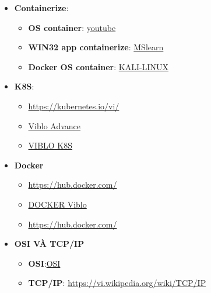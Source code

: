 \documentclass[a4paper,12pt]{article}
\begin{document}
\begin{itemize}
    \item \textbf{Containerize}:
    \begin{itemize}
        \item \textbf{OS container}: \href{ https://www.youtube.com/watch?v=kICnD0pRBZU&pp=ygUlY29udGFpbmVyaXplIGEgbGludXggb3BlcmF0aW5nIHN5c3RlbQ%3D%3D}
        {youtube}
        \item  \textbf{WIN32 app containerize}: \href{https://learn.microsoft.com/vi-vn/windows/win32/com/containers}{MSlearn}
        \item \textbf{Docker OS container}: \href{https://www.kali.org/docs/containers/kalilinux-lxc-images/}{KALI-LINUX}
    \end{itemize}
    \item \textbf{K8S}:
    \begin{itemize}
        \item \href{https://kubernetes.io/vi/}{https://kubernetes.io/vi/}
        \item  \href{https://viblo.asia/p/kubernetes-so-sanh-giua-deployments-statefulsets-va-daemonsets-khi-nao-nen-su-dung-chung-ORNZqXd3K0n}{Viblo Advance}
        \item \href{https://viblo.asia/p/tim-hieu-co-ban-ve-kubernetes-k8s-part-1-924lJ4bbKPM}{VIBLO K8S}
    \end{itemize}
    \item \textbf{Docker}
    \begin{itemize}
        \item \href{https://hub.docker.com/}{https://hub.docker.com/}
        \item \href{https://viblo.asia/p/docker-la-gi-kien-thuc-co-ban-ve-docker-maGK7qeelj2}{DOCKER Viblo}
        \item \href{https://hub.docker.com/}{https://hub.docker.com/}
    \end{itemize}
    \item \textbf{OSI VÀ TCP/IP}
    \begin{itemize}
        \item \textbf{OSI}:\href{https://en.wikipedia.org/wiki/OSI_model}{OSI}
        \item \textbf{TCP/IP}: \href{https://vi.wikipedia.org/wiki/TCP/IP}{https://vi.wikipedia.org/wiki/TCP/IP}
    \end{itemize}
\end{itemize}
\end{document}
